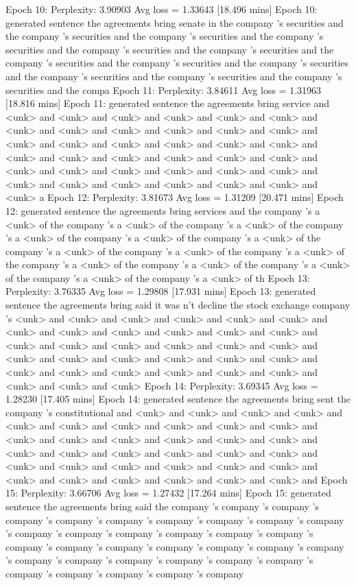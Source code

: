 \documentclass{article}
\begin{document}
Epoch 10: Perplexity: 3.90903 Avg loss = 1.33643 [18.496 mins]
Epoch 10: generated sentence 
the agreements bring senate in the company 's securities and the company 's securities and the company 's securities and the company 's securities and the company 's securities and the company 's securities and the company 's securities and the company 's securities and the company 's securities and the company 's securities and the company 's securities and the company 's securities and the compa
Epoch 11: Perplexity: 3.84611 Avg loss = 1.31963 [18.816 mins]
Epoch 11: generated sentence 
the agreements bring service and <unk> and <unk> and <unk> and <unk> and <unk> and <unk> and <unk> and <unk> and <unk> and <unk> and <unk> and <unk> and <unk> and <unk> and <unk> and <unk> and <unk> and <unk> and <unk> and <unk> and <unk> and <unk> and <unk> and <unk> and <unk> and <unk> and <unk> and <unk> and <unk> and <unk> and <unk> and <unk> and <unk> and <unk> and <unk> and <unk> and <unk> a
Epoch 12: Perplexity: 3.81673 Avg loss = 1.31209 [20.471 mins]
Epoch 12: generated sentence 
the agreements bring services and the company 's a <unk> of the company 's a <unk> of the company 's a <unk> of the company 's a <unk> of the company 's a <unk> of the company 's a <unk> of the company 's a <unk> of the company 's a <unk> of the company 's a <unk> of the company 's a <unk> of the company 's a <unk> of the company 's a <unk> of the company 's a <unk> of the company 's a <unk> of th
Epoch 13: Perplexity: 3.76335 Avg loss = 1.29808 [17.931 mins]
Epoch 13: generated sentence 
the agreements bring said it was n't decline the stock exchange company 's <unk> and <unk> and <unk> and <unk> and <unk> and <unk> and <unk> and <unk> and <unk> and <unk> and <unk> and <unk> and <unk> and <unk> and <unk> and <unk> and <unk> and <unk> and <unk> and <unk> and <unk> and <unk> and <unk> and <unk> and <unk> and <unk> and <unk> and <unk> and <unk> and <unk> and <unk> and <unk> and <unk>
Epoch 14: Perplexity: 3.69345 Avg loss = 1.28230 [17.405 mins]
Epoch 14: generated sentence 
the agreements bring sent the company 's constitutional and <unk> and <unk> and <unk> and <unk> and <unk> and <unk> and <unk> and <unk> and <unk> and <unk> and <unk> and <unk> and <unk> and <unk> and <unk> and <unk> and <unk> and <unk> and <unk> and <unk> and <unk> and <unk> and <unk> and <unk> and <unk> and <unk> and <unk> and <unk> and <unk> and <unk> and <unk> and <unk> and <unk> and <unk> and 
Epoch 15: Perplexity: 3.66706 Avg loss = 1.27432 [17.264 mins]
Epoch 15: generated sentence 
the agreements bring said the company 's company 's company 's company 's company 's company 's company 's company 's company 's company 's company 's company 's company 's company 's company 's company 's company 's company 's company 's company 's company 's company 's company 's company 's company 's company 's company 's company 's company 's company 's company 's company 's company 's company
\end{document}

